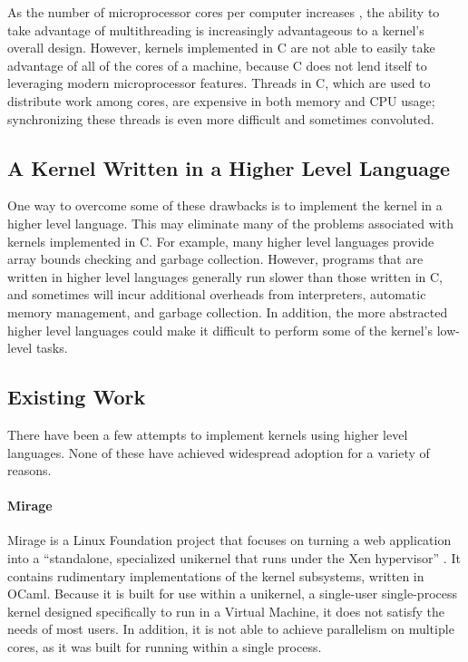 \documentclass[twocolumn,10pt]{article}
\begin{document}
As the number of microprocessor cores per computer increases \cite{Sutter:concurrency}, the ability to take advantage of multithreading is increasingly advantageous to a kernel's overall design.
However, kernels implemented in C are not able to easily take advantage of all of the cores of a machine, because C does not lend itself to leveraging modern microprocessor features. Threads in C, which are used to distribute work among cores, are expensive in both memory and CPU usage; synchronizing these threads is even more difficult and sometimes convoluted.

\subsection{A Kernel Written in a Higher Level Language}

One way to overcome some of these drawbacks is to implement the kernel in a higher level language. This may eliminate many of the problems associated with kernels implemented in C. For example, many higher level languages provide array bounds checking and garbage collection. However, programs that are written in higher level languages generally run slower than those written in C, and sometimes will incur additional overheads from interpreters, automatic memory management, and garbage collection. In addition, the more abstracted higher level languages could make it difficult to perform some of the kernel's low-level tasks.

\subsection{Existing Work}
There have been a few attempts to implement kernels using higher level languages. None of these have achieved widespread adoption for a variety of reasons. 

\paragraph{Mirage}
Mirage is a Linux Foundation project that focuses on turning a web application into a ``standalone, specialized unikernel that runs under the Xen hypervisor'' \cite{MirageOS}. It contains rudimentary implementations of the kernel subsystems, written in OCaml. Because it is built for use within a unikernel, a single-user single-process kernel designed specifically to run in a Virtual Machine, it does not satisfy the needs of most users. In addition, it is not able to achieve parallelism on multiple cores, as it was built for running within a single process.
\end{document}
